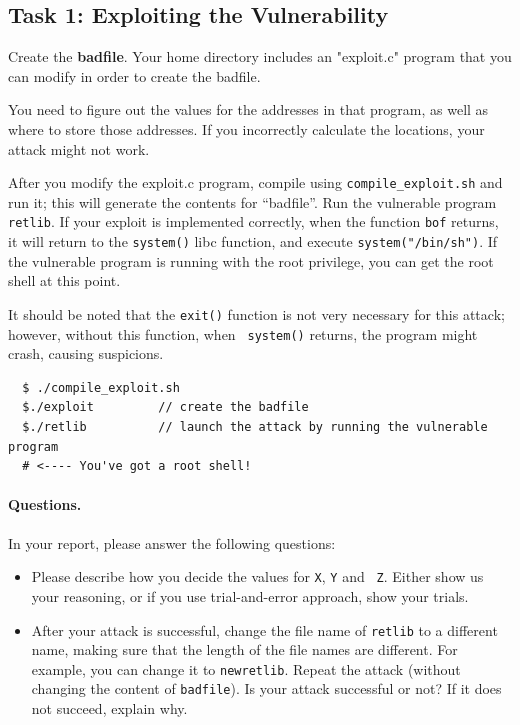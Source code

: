 \subsection{Task 1: Exploiting the Vulnerability} 
Create the \textbf{badfile}. Your home directory includes an "exploit.c" program
that you can modify in order to create the badfile.

You need to figure out the values for the addresses in that program, as well 
as where to store those addresses. If you incorrectly calculate
the locations, your attack might not work.

After you modify the exploit.c program, compile using \texttt{compile\_exploit.sh} 
and run it; this will
generate the contents for ``badfile''. Run the vulnerable program {\tt
  retlib}. If your exploit is implemented correctly, when the function
{\tt bof} returns, it will return to the {\tt system()} libc function,
and execute {\tt system("/bin/sh")}. If the vulnerable program is
running with the root privilege, you can get the root shell at this
point.

It should be noted that the {\tt exit()} function is not very
necessary for this attack; however, without this function, when {\tt
  system()} returns, the program might crash, causing suspicions.

\begin{verbatim}
  $ ./compile_exploit.sh
  $./exploit         // create the badfile
  $./retlib          // launch the attack by running the vulnerable program
  # <---- You've got a root shell! 
\end{verbatim}


\paragraph{Questions.} In your report, please answer the following questions:
\begin{itemize}
\item Please describe how you decide the values for {\tt X}, {\tt Y} and {\tt
Z}. Either show us your reasoning, or if you use trial-and-error approach,
show your trials.

\item After your attack is successful, change the file name of {\tt retlib}
to a different name, making sure that the length of the file names are
different. For example, you can change it to {\tt newretlib}. Repeat the
attack (without changing the content of {\tt badfile}). Is your attack
successful or not? If it does not succeed, explain why.

\end{itemize}


